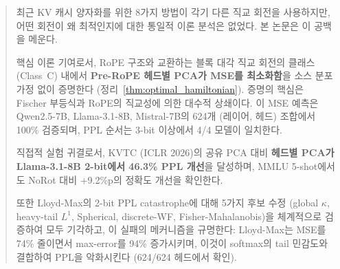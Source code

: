 \begin{abstract}
최근 KV 캐시 양자화를 위한 8가지 방법이 각기 다른 직교 회전을 사용하지만, 어떤 회전이 왜 최적인지에 대한 통일적 이론 분석은 없었다. 본 논문은 이 공백을 메운다.

핵심 이론 기여로서, RoPE 구조와 교환하는 블록 대각 직교 회전의 클래스 (Class~C) 내에서 \textbf{Pre-RoPE 헤드별 PCA가 MSE를 최소화함}을 소스 분포 가정 없이 증명한다 (정리~\ref{thm:optimal_hamiltonian}). 증명의 핵심은 Fischer 부등식과 RoPE의 직교성에 의한 대수적 상쇄이다. 이 MSE 예측은 Qwen2.5-7B, Llama-3.1-8B, Mistral-7B의 624개 (레이어, 헤드) 조합에서 100\% 검증되며, PPL 순서는 3-bit 이상에서 4/4 모델이 일치한다.

직접적 실험 귀결로서, KVTC (ICLR 2026)의 공유 PCA 대비 \textbf{헤드별 PCA가 Llama-3.1-8B 2-bit에서 46.3\% PPL 개선}을 달성하며, MMLU 5-shot에서도 NoRot 대비 +9.2\%p의 정확도 개선을 확인한다.

또한 Lloyd-Max의 2-bit PPL catastrophe에 대해 5가지 후보 수정 (global $\kappa$, heavy-tail $L^1$, Spherical, discrete-WF, Fisher-Mahalanobis)을 체계적으로 검증하여 모두 기각하고, 이 실패의 메커니즘을 규명한다: Lloyd-Max는 MSE를 74\% 줄이면서 max-error를 94\% 증가시키며, 이것이 softmax의 tail 민감도와 결합하여 PPL을 악화시킨다 (624/624 헤드에서 확인).
\end{abstract}
